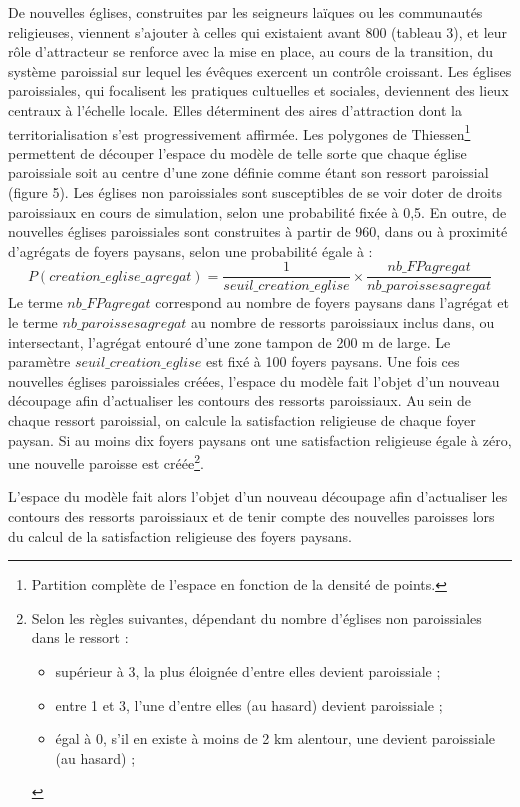 \documentclass[12pt, a4paper, oneside]{book}
\begin{document}
	De nouvelles églises, construites par les seigneurs laïques ou les communautés religieuses, viennent s'ajouter à celles qui existaient avant 800 (tableau 3), et leur rôle d'attracteur se renforce avec la mise en place, au cours de la transition, du système paroissial sur lequel les évêques exercent un contrôle croissant.
	Les églises paroissiales, qui focalisent les pratiques cultuelles et sociales, deviennent des lieux centraux à l'échelle locale.
	Elles déterminent des aires d'attraction dont la territorialisation s'est progressivement affirmée.
	Les polygones de Thiessen\footnote{
	Partition complète de l’espace en fonction de la densité de points.
} permettent de découper l'espace du modèle de telle sorte que chaque église paroissiale soit au centre d'une zone définie comme étant son ressort paroissial (figure 5).
	Les églises non paroissiales sont susceptibles de se voir doter de droits paroissiaux en cours de simulation, selon une probabilité fixée à 0,5.
	En outre, de nouvelles églises paroissiales sont construites à partir de 960, dans ou à proximité d'agrégats de foyers paysans, selon une probabilité égale à :
	$$P(creation\_eglise\_agregat) = \frac{1}{seuil\_creation\_eglise} × \frac{nb\_FPagregat}{nb\_paroissesagregat}$$
	Le terme $nb\_FPagregat$ correspond au nombre de foyers paysans dans
	l'agrégat et le terme $nb\_paroissesagregat$ au nombre de ressorts paroissiaux inclus dans, ou intersectant, l'agrégat entouré d'une zone tampon de 200 m de large.
	Le paramètre $seuil\_creation\_eglise$ est fixé à 100 foyers paysans.
	Une fois ces nouvelles églises paroissiales créées, l'espace du modèle fait l'objet d'un nouveau découpage afin d'actualiser les contours des ressorts paroissiaux.
	Au sein de chaque ressort paroissial, on calcule la satisfaction religieuse de chaque foyer paysan.
	Si au moins dix foyers paysans ont une satisfaction religieuse égale à zéro, une nouvelle paroisse est créée\footnote{
	Selon les règles suivantes, dépendant du nombre d’églises non paroissiales dans le ressort :
	\begin{itemize}
		\item supérieur à 3, la plus éloignée d’entre elles devient paroissiale ;
		\item entre 1 et 3, l’une d’entre elles (au hasard) devient paroissiale ;
		\item égal à 0, s’il en existe à moins de 2 km alentour, une devient paroissiale (au hasard) ;
	\end{itemize}
}.
	
	L'espace du modèle fait alors l'objet d'un nouveau découpage afin d'actualiser les contours des ressorts paroissiaux et de tenir compte des nouvelles paroisses lors du calcul de la satisfaction religieuse des foyers paysans.
	
\end{document}
